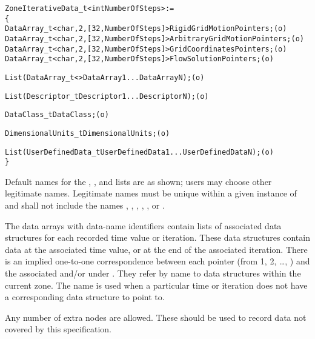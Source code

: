 \begin{alltt}
  ZoneIterativeData\_t< int NumberOfSteps > :=
    \{
    DataArray\_t<char, 2, [32, NumberOfSteps]> RigidGridMotionPointers ;     (o)
    DataArray\_t<char, 2, [32, NumberOfSteps]> ArbitraryGridMotionPointers ; (o)
    DataArray\_t<char, 2, [32, NumberOfSteps]> GridCoordinatesPointers ;     (o)
    DataArray\_t<char, 2, [32, NumberOfSteps]> FlowSolutionPointers ;        (o)

    List( DataArray\_t<> DataArray1 ... DataArrayN ) ;                       (o)

    List( Descriptor\_t Descriptor1 ... DescriptorN ) ;                      (o)

    DataClass\_t DataClass ;                                                 (o)

    DimensionalUnits\_t DimensionalUnits ;                                   (o)

    List( UserDefinedData\_t UserDefinedData1 ... UserDefinedDataN ) ;       (o)
    \}
\end{alltt}

\begin{notes}
\item Default names for the , , and
      lists are as shown; users may choose other legitimate names.
      Legitimate names must be unique within a given
      instance of  and shall not
      include the names ,
      , ,
      , , or
      .
\end{notes}

The data arrays with data-name identifiers 
contain lists of associated data structures for each recorded time value
or iteration.
These data structures contain data at the associated time value, or at
the end of the associated iteration.
There is an implied one-to-one correspondence between each pointer (from
1, 2, \ldots, ) and the associated 
and/or  under .
They refer by name to data structures within the current zone.
The name  is used when a particular time or iteration
does not have a corresponding data structure to point to.

Any number of extra  nodes are allowed.
These should be used to record data not covered by this specification.


